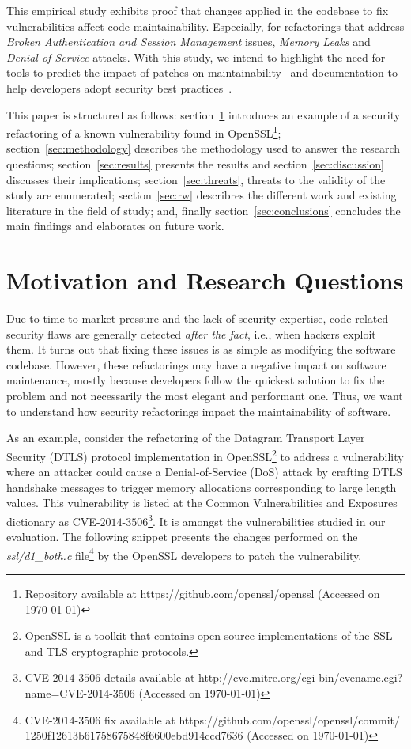 \documentclass[10pt,conference]{IEEEtran}
\begin{document}
This empirical study exhibits proof that changes applied in the codebase to fix
vulnerabilities affect code maintainability. Especially, for refactorings that
address \emph{Broken Authentication and Session Management} issues, \emph{Memory
Leaks} and \emph{Denial-of-Service} attacks. With this study, we intend to highlight
the need for tools to predict the impact of patches on maintainability~\cite{4724577}
and documentation to help developers adopt security best practices~\cite{6311252,
7927935, MESQUIDA201519}.

This paper is structured as follows: section~\ref{sec:motivation} introduces an
example of a security refactoring of a known vulnerability found in
OpenSSL\footnote{Repository available at https://github.com/openssl/openssl
(Accessed on \today{})}; section~\ref{sec:methodology} describes the
methodology used to answer the research questions; section~\ref{sec:results}
presents the results and section~\ref{sec:discussion} discusses their
implications; section~\ref{sec:threats}, threats to the validity of the study
are enumerated; section~\ref{sec:rw} describres the different work and existing
literature in the field of study; and, finally section~\ref{sec:conclusions}
concludes the main findings and elaborates on future work.
%
\section{Motivation and Research Questions}\label{sec:motivation}
%
Due to time-to-market pressure and the lack of security expertise, code-related
security flaws are generally detected \textit{after the fact}, i.e., when
hackers exploit them. It turns out that fixing these issues is as simple as
modifying the software codebase. However, these refactorings may have a negative
impact on software maintenance, mostly because developers follow the quickest
solution to fix the problem and not necessarily the most elegant and performant
one. Thus, we want to understand how security refactorings impact the
maintainability of software.

As an example, consider the refactoring of the Datagram Transport Layer Security
(DTLS) protocol implementation in OpenSSL\footnote{OpenSSL is a toolkit that
contains open-source implementations of the SSL and TLS cryptographic
protocols.} to address a vulnerability where an attacker could cause a Denial-of-Service
(DoS) attack by crafting DTLS handshake messages to trigger memory allocations
corresponding to large length values. This vulnerability is listed at the Common
Vulnerabilities and Exposures dictionary as CVE-$2014$-$3506$\footnote{CVE-$2014$-$3506$
details available at http://cve.mitre.org/cgi-bin/cvename.cgi?name=CVE-2014-3506
(Accessed on \today{})}. It is amongst the vulnerabilities studied in our
evaluation. The following snippet presents the changes performed on the
\emph{ssl/d1\_both.c} file\footnote{CVE-$2014$-$3506$ fix available  at
https://github.com/openssl/openssl/commit/\\1250f12613b61758675848f6600ebd914ccd7636
(Accessed on \today{})} by the OpenSSL developers to patch the vulnerability.
\end{document}
